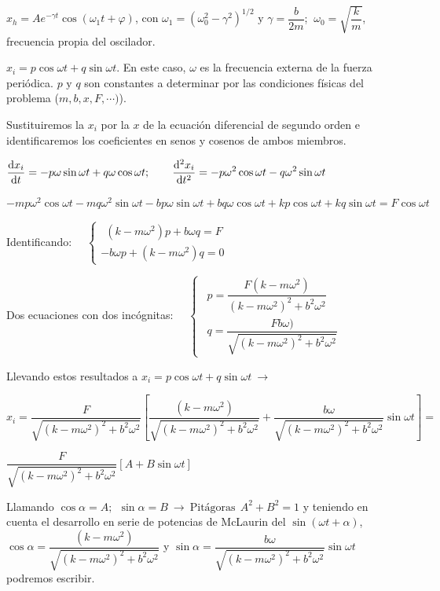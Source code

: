 $x_h=Ae^{-\gamma t}\cos (\omega_1t+\varphi)$, con $\omega_1=(\omega_0^2-\gamma^2)^{1/2} \text{ y } \gamma=\dfrac{b}{2m}$; $\ \omega_0=\sqrt{\dfrac k m}$, frecuencia propia del oscilador.

$x_i=p\cos \omega t + q \sin \omega t$. En este caso, $\omega$ es la frecuencia externa de la fuerza periódica. $p \text{ y } q$ son constantes a determinar por las condiciones físicas del problema ($m, b, x, F, \cdots)$).

Sustituiremos la  $x_i$ por la $x$ de la ecuación diferencial de segundo orden e identificaremos los coeficientes en senos y cosenos de ambos miembros.

$\displaystyle \dv{x_i}{t}=-p\omega \sin \omega t +q\omega
\cos \omega t; \qquad \displaystyle \dv[2]{x_i}{t}=-p\omega^2 \cos \omega t - q \omega^2 \sin \omega t$

$-mp\omega^2 \cos \omega t-mq\omega^2 \sin \omega t -bp\omega \sin \omega t +bq\omega \cos \omega t +kp\cos \omega t +kq\sin \omega t=F\cos \omega t$

Identificando: $\quad \begin{cases}
 \ \ (k-m\omega^2)p+b\omega q=F \\ -b\omega p+(k-m\omega^2)q=0	
 \end{cases}$
 
 Dos ecuaciones con dos incógnitas: $\quad \begin{cases}
\ \ p=\dfrac{F(k-m\omega^2)}{(k-m\omega^2)^2+b^2\omega^2} \\ \ \ q=\dfrac{Fb\omega)}{\sqrt{(k-m\omega^2)^2+b^2\omega^2}}	
\end{cases}$

Llevando estos resultados a $x_i=p\cos \omega t + q \sin \omega t \ \to$

\small{$x_i=\dfrac{F}{\sqrt{(k-m\omega^2)^2+b^2\omega^2}} \left[
\dfrac{(k-m\omega^2)}{\sqrt{(k-m\omega^2)^2+b^2\omega^2}}+
\dfrac{b\omega}{\sqrt{(k-m\omega^2)^2+b^2\omega^2}}\sin \omega t
\right]=$}

\normalsize{$\dfrac{F}{\sqrt{(k-m\omega^2)^2+b^2\omega^2}} [A+B\sin \omega t]$}

Llamando $\cos \alpha=A;\ \ \sin \alpha =B \ \to \ \text{Pitágoras} \ \ A^2+B^2=1$ y teniendo en cuenta el desarrollo en serie de potencias de McLaurin del $\sin (\omega t + \alpha)$, \textcolor{gris}{$\cos \alpha=\dfrac{(k-m\omega^2)}{\sqrt{(k-m\omega^2)^2+b^2\omega^2}}$} y \textcolor{gris}{$\sin \alpha=\dfrac{b\omega}{\sqrt{(k-m\omega^2)^2+b^2\omega^2}}\sin \omega t\ $} podremos escribir.

